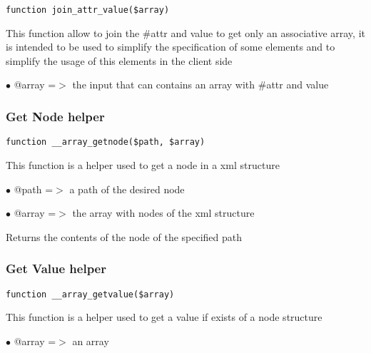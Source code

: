 \documentclass[a4paper]{article}
\begin{document}
\begin{lstlisting}
function join_attr_value($array)
\end{lstlisting}

This function allow to join the \#attr and value to get only an associative
array, it is intended to be used to simplify the specification of some elements
and to simplify the usage of this elements in the client side

\begin{compactitem}
\item[\color{myblue}$\bullet$] @array =$>$ the input that can contains an array with \#attr and value
\end{compactitem}

\hypertarget{toc52}{}
\subsubsection{Get Node helper}

\begin{lstlisting}
function __array_getnode($path, $array)
\end{lstlisting}

This function is a helper used to get a node in a xml structure

\begin{compactitem}
\item[\color{myblue}$\bullet$] @path  =$>$ a path of the desired node
\item[\color{myblue}$\bullet$] @array =$>$ the array with nodes of the xml structure
\end{compactitem}

Returns the contents of the node of the specified path

\hypertarget{toc53}{}
\subsubsection{Get Value helper}

\begin{lstlisting}
function __array_getvalue($array)
\end{lstlisting}

This function is a helper used to get a value if exists of a node structure

\begin{compactitem}
\item[\color{myblue}$\bullet$] @array =$>$ an array
\end{compactitem}
\end{document}
